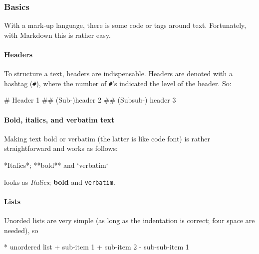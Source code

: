 \documentclass[]{article}
\newenvironment{Shaded}{\begin{snugshade}}{\end{snugshade}}
\newcommand{\BaseNTok}[1]{\textcolor[rgb]{0.00,0.00,0.81}{#1}}
\newcommand{\FloatTok}[1]{\textcolor[rgb]{0.00,0.00,0.81}{#1}}
\newcommand{\FunctionTok}[1]{\textcolor[rgb]{0.00,0.00,0.00}{#1}}
\newcommand{\NormalTok}[1]{#1}
\let\oldparagraph\paragraph
\renewcommand{\paragraph}[1]{\oldparagraph{#1}\mbox{}}
\theoremstyle{definition}
\theoremstyle{definition}
\theoremstyle{definition}
\theoremstyle{remark}
\begin{document}
\subsubsection{Basics}\label{basics}

With a mark-up language, there is some code or tags around text.
Fortunately, with Markdown this is rather easy.

\paragraph{Headers}\label{headers}

To structure a text, headers are indispensable. Headers are denoted with
a hashtag (\texttt{\#}), where the number of \texttt{\#}'s indicated the
level of the header. So:

\begin{Shaded}
\begin{Highlighting}[]
\FunctionTok{# Header 1}
\FunctionTok{## (Sub-)header 2}
\FunctionTok{## (Subsub-) header 3}
\end{Highlighting}
\end{Shaded}

\paragraph{Bold, italics, and verbatim
text}\label{bold-italics-and-verbatim-text}

Making text bold or verbatim (the latter is like code font) is rather
straightforward and works as follows:

\begin{Shaded}
\begin{Highlighting}[]
\NormalTok{*Italics*; **bold** and }\BaseNTok{`verbatim`} 
\end{Highlighting}
\end{Shaded}

looks as \emph{Italics}; \textbf{bold} and \texttt{verbatim}.

\paragraph{Lists}\label{lists}

Unorded lists are very simple (as long as the indentation is correct;
four space are needed), so

\begin{Shaded}
\begin{Highlighting}[]
\NormalTok{* }\FloatTok{unordered list}
\FloatTok{    + sub-item 1}
\FloatTok{    + sub-item 2}
\FloatTok{        - sub-sub-item 1 }
\end{Highlighting}
\end{Shaded}
\end{document}
